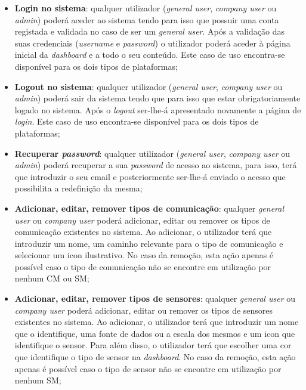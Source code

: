 \begin{itemize}
	\item \textbf{Login no sistema}: qualquer utilizador (\textit{general user}, \textit{company user} ou \textit{admin}) poderá aceder ao sistema tendo para isso que possuir uma conta registada e validada no caso de ser um \textit{general user}. Após a validação das suas credenciais (\textit{username} e \textit{password}) o utilizador poderá aceder à página inicial da \textit{dashboard} e a todo o seu conteúdo. Este caso de uso encontra-se disponível para os dois tipos de plataformas; 
	
	
	\item \textbf{Logout no sistema}: qualquer utilizador (\textit{general user}, \textit{company user} ou \textit{admin}) poderá sair da sistema tendo que para isso que estar obrigatoriamente logado no sistema. Após o \textit{logout} ser-lhe-á apresentado novamente a página de \textit{login}. Este caso de uso encontra-se disponível para os dois tipos de plataformas; 
	
	
	\item \textbf{Recuperar \textit{password}}: qualquer utilizador (\textit{general user}, \textit{company user} ou \textit{admin}) poderá recuperar a sua \textit{password} de acesso ao sistema, para isso, terá que introduzir o seu email e posteriormente ser-lhe-á enviado o acesso que possibilita a redefinição da mesma; 
	
	
	
	\item \textbf{Adicionar, editar, remover tipos de comunicação}: qualquer \textit{general user} ou \textit{company user} poderá adicionar, editar ou remover os tipos de comunicação existentes no sistema. Ao  adicionar, o utilizador terá que introduzir um nome, um caminho relevante para o tipo de comunicação e selecionar um icon ilustrativo. No caso da remoção, esta ação apenas é possível caso o tipo de comunicação não se encontre em utilização por nenhum \acl{CM} ou \acl{SM};  
	
	\item \textbf{Adicionar, editar, remover tipos de sensores}: qualquer \textit{general user} ou \textit{company user} poderá adicionar, editar ou remover os tipos de sensores existentes no sistema. Ao  adicionar, o utilizador terá que introduzir um nome que o identifique, uma fonte de dados ou a escala dos mesmos e um icon que identifique o sensor. Para além disso, o utilizador terá que escolher uma cor que identifique o tipo de sensor na \textit{dashboard}. No caso da remoção, esta ação apenas é possível caso o tipo de sensor não se encontre em utilização por nenhum \acl{SM};   
	 

\end{itemize}
